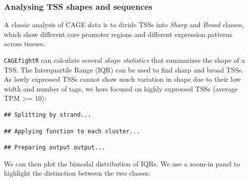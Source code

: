 \documentclass[9pt,a4paper,]{extarticle}
\newenvironment{Shaded}{\begin{snugshade}}{\end{snugshade}}
\newcommand{\KeywordTok}[1]{\textcolor[rgb]{0.13,0.29,0.53}{\textbf{{#1}}}}
\newcommand{\DataTypeTok}[1]{\textcolor[rgb]{0.13,0.29,0.53}{{#1}}}
\newcommand{\DecValTok}[1]{\textcolor[rgb]{0.00,0.00,0.81}{{#1}}}
\newcommand{\FloatTok}[1]{\textcolor[rgb]{0.00,0.00,0.81}{{#1}}}
\newcommand{\StringTok}[1]{\textcolor[rgb]{0.31,0.60,0.02}{{#1}}}
\newcommand{\CommentTok}[1]{\textcolor[rgb]{0.56,0.35,0.01}{\textit{{#1}}}}
\newcommand{\NormalTok}[1]{{#1}}
\begin{document}
\subsubsection{Analysing TSS shapes and sequences}\label{analysing-tss-shapes-and-sequences}

A classic analysis of CAGE data is to divide TSSs into \emph{Sharp} and \emph{Broad} classes, which show different core promoter regions and different expression patterns across tissues\citep{Carninci2006}.

\texttt{CAGEfightR} can calculate several \emph{shape statistics} that summarizes the shape of a TSS. The Interquartile Range (IQR) can be used to find sharp and broad TSSs. As lowly expressed TSSs cannot show much variation in shape due to their low width and number of tags, we here focused on highly expressed TSSs (average TPM \textgreater{}= 10):

\begin{Shaded}
\end{Shaded}

\begin{verbatim}
## Splitting by strand...
\end{verbatim}

\begin{verbatim}
## Applying function to each cluster...
\end{verbatim}

\begin{verbatim}
## Preparing output output...
\end{verbatim}

We can then plot the bimodal distribution of IQRs. We use a zoom-in panel to highlight the distinction between the two classes:
\end{document}
